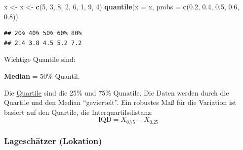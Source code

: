 \documentclass[
]{article}
\newenvironment{Shaded}{\begin{snugshade}}{\end{snugshade}}
\newcommand{\AttributeTok}[1]{\textcolor[rgb]{0.13,0.29,0.53}{#1}}
\newcommand{\DecValTok}[1]{\textcolor[rgb]{0.00,0.00,0.81}{#1}}
\newcommand{\FloatTok}[1]{\textcolor[rgb]{0.00,0.00,0.81}{#1}}
\newcommand{\FunctionTok}[1]{\textcolor[rgb]{0.13,0.29,0.53}{\textbf{#1}}}
\newcommand{\NormalTok}[1]{#1}
\newcommand{\OtherTok}[1]{\textcolor[rgb]{0.56,0.35,0.01}{#1}}
\begin{document}
\begin{Shaded}
\begin{Highlighting}[]
\NormalTok{x }\OtherTok{\textless{}{-}}\NormalTok{ x }\OtherTok{\textless{}{-}} \FunctionTok{c}\NormalTok{(}\DecValTok{5}\NormalTok{, }\DecValTok{3}\NormalTok{, }\DecValTok{8}\NormalTok{, }\DecValTok{2}\NormalTok{, }\DecValTok{6}\NormalTok{, }\DecValTok{1}\NormalTok{, }\DecValTok{9}\NormalTok{, }\DecValTok{4}\NormalTok{)}
\FunctionTok{quantile}\NormalTok{(}\AttributeTok{x =}\NormalTok{ x, }\AttributeTok{probs =} \FunctionTok{c}\NormalTok{(}\FloatTok{0.2}\NormalTok{, }\FloatTok{0.4}\NormalTok{, }\FloatTok{0.5}\NormalTok{, }\FloatTok{0.6}\NormalTok{, }\FloatTok{0.8}\NormalTok{))}
\end{Highlighting}
\end{Shaded}

\begin{verbatim}
## 20% 40% 50% 60% 80% 
## 2.4 3.8 4.5 5.2 7.2
\end{verbatim}

Wichtige Quantile sind:

\tcolorbox

\textbf{Median} = 50\% Quantil.

\vspace{2mm}

Die \underline{Quartile} sind die 25\% und 75\% Qunatile. Die Daten
werden durch die Quartile und den Median ``geviertelt''. Ein robustes
Maß für die Variation ist basiert auf den Quartile, die
Interquartilsdistanz: \[\text{IQD} = X_{0.75} - X_{0.25}\]

\endtcolorbox

\hypertarget{lageschuxe4tzer-lokation}{%
\subsubsection{Lageschätzer (Lokation)}\label{lageschuxe4tzer-lokation}}

\tcolorbox
\end{document}
